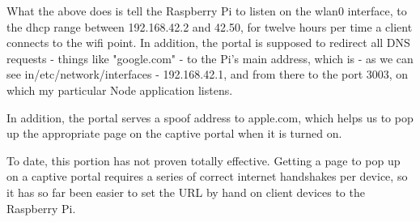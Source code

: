 What the above does is tell the Raspberry Pi to listen on the wlan0 interface, to the dhcp range between 192.168.42.2 and 42.50, for twelve hours per time a client connects to the wifi point.  In addition, the portal is supposed to redirect all DNS requests - things like "google.com" - to the Pi's main address, which is - as we can see in/etc/network/interfaces - 192.168.42.1, and from there to the port 3003, on which my particular Node application listens.

In addition, the portal serves a spoof address to apple.com, which helps us to pop up the appropriate page on the captive portal when it is turned on. 

To date, this portion has not proven totally effective. Getting a page to pop up on a captive portal requires a series of correct internet handshakes per device, so it has so far been easier to set the URL by hand on client devices to the Raspberry Pi.
 

